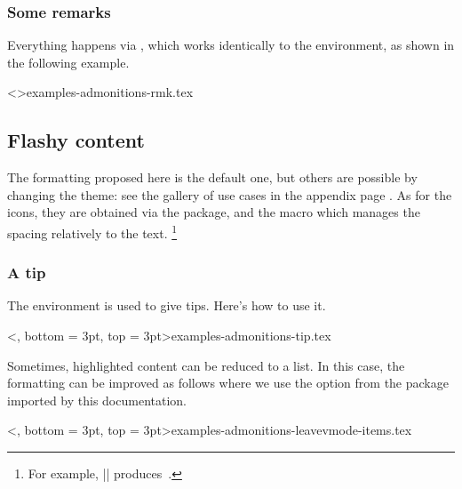 \subsubsection{Some remarks}

Everything happens via , which works identically to the  environment, as shown in the following example.

\tdoclatexinput<>{examples-admonitions-rmk.tex}


\subsection{Flashy content}
\label{tutodoc-admonitions}

\begin{tdocnote}
    The formatting proposed here is the default one, but others are possible by changing the theme: see the gallery of use cases in the appendix page \pageref{tutodoc-theme-gallery}.
    As for the icons, they are obtained via the  package, and the  macro which manages the spacing relatively to the text.%
    \footnote{
        For example,
        \tdoclatexin||
        produces
        \,.
    }
\end{tdocnote}


\subsubsection{A tip}

The  environment is used to give tips. Here's how to use it.

\tdoclatexinput<, bottom = 3pt, top = 3pt>{examples-admonitions-tip.tex}


\smallskip


\begin{tdoctip}
    Sometimes, highlighted content can be reduced to a list. In this case, the formatting can be improved as follows where we use the  option from the  package imported by this documentation.

    \tdoclatexinput<, bottom = 3pt, top = 3pt>{examples-admonitions-leavevmode-items.tex}
\end{tdoctip}


